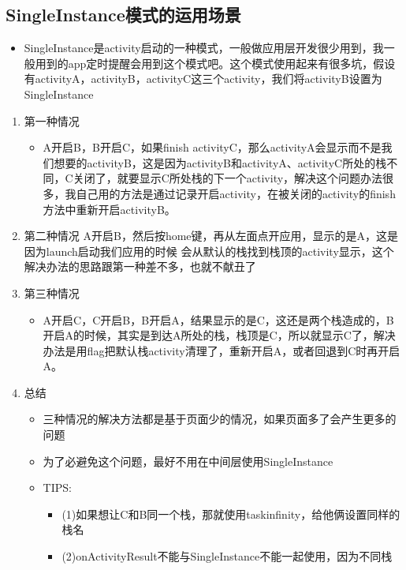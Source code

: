 \documentclass[9pt, b5paaper]{book}
\begin{document}
\subsection{SingleInstance模式的运用场景}
\label{sec-4-10-3}
\begin{itemize}
\item SingleInstance是activity启动的一种模式，一般做应用层开发很少用到，我一般用到的app定时提醒会用到这个模式吧。这个模式使用起来有很多坑，假设有activityA，activityB，activityC这三个activity，我们将activityB设置为SingleInstance
\end{itemize}
\begin{enumerate}
\item 第一种情况
\label{sec-4-10-3-1}
\begin{itemize}
\item A开启B，B开启C，如果finish activityC，那么activityA会显示而不是我们想要的activityB，这是因为activityB和activityA、activityC所处的栈不同，C关闭了，就要显示C所处栈的下一个activity，解决这个问题办法很多，我自己用的方法是通过记录开启activity，在被关闭的activity的finish方法中重新开启activityB。
\end{itemize}
\item 第二种情况
\label{sec-4-10-3-2}
A开启B，然后按home键，再从左面点开应用，显示的是A，这是因为launch启动我们应用的时候 会从默认的栈找到栈顶的activity显示，这个解决办法的思路跟第一种差不多，也就不献丑了
\item 第三种情况
\label{sec-4-10-3-3}
\begin{itemize}
\item A开启C，C开启B，B开启A，结果显示的是C，这还是两个栈造成的，B开启A的时候，其实是到达A所处的栈，栈顶是C，所以就显示C了，解决办法是用flag把默认栈activity清理了，重新开启A，或者回退到C时再开启A。
\end{itemize}
\item 总结
\label{sec-4-10-3-4}
\begin{itemize}
\item 三种情况的解决方法都是基于页面少的情况，如果页面多了会产生更多的问题
\item 为了必避免这个问题，最好不用在中间层使用SingleInstance
\item TIPS:  
\begin{itemize}
\item (1)如果想让C和B同一个栈，那就使用taskinfinity，给他俩设置同样的栈名
\item (2)onActivityResult不能与SingleInstance不能一起使用，因为不同栈
\end{itemize}
\end{itemize}
\end{enumerate}
\end{document}
